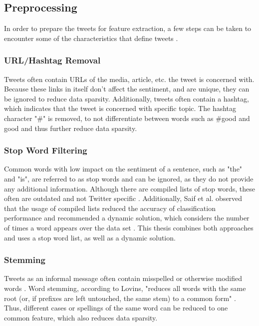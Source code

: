 \subsection{Preprocessing}
In order to prepare the tweets for feature extraction, a few steps can be taken to encounter some of the characteristics that define tweets \cite{DBLP:journals/csur/GiachanouC16}.

\subsubsection{URL/Hashtag Removal}
Tweets often contain URLs of the media, article, etc. the tweet is concerned with. Because these links in itself don't affect the sentiment, and are unique, they can be ignored to reduce data sparsity. Additionally, tweets often contain a hashtag, which indicates that the tweet is concerned with specific topic. The hashtag character "\#" is removed, to not differentiate between words such as \#good and good and thus further reduce data sparsity.

\subsubsection{Stop Word Filtering}
Common words with low impact on the sentiment of a sentence, such as "the" and "is", are referred to as stop words and can be ignored, as they do not provide any additional information. Although there are compiled lists of stop words, these often are outdated and not Twitter specific \cite{DBLP:journals/csur/GiachanouC16}. Additionally, Saif et al. observed that the usage of compiled lists reduced the accuracy of classification performance and recommended a dynamic solution, which considers the number of times a word appears over the data set \cite{data_sparsity}. This thesis combines both approaches and uses a stop word list, as well as a dynamic solution.

\subsubsection{Stemming}
Tweets as an informal message often contain misspelled or otherwise modified words \cite{DBLP:journals/csur/GiachanouC16}. Word stemming, according to Lovins, "reduces all words with the same root (or, if prefixes are left
untouched, the same stem) to a common form" \cite[p.~22]{Lovins1968DevelopmentOA}. Thus, different cases or spellings of the same word can be reduced to one common feature, which also reduces data sparsity.

